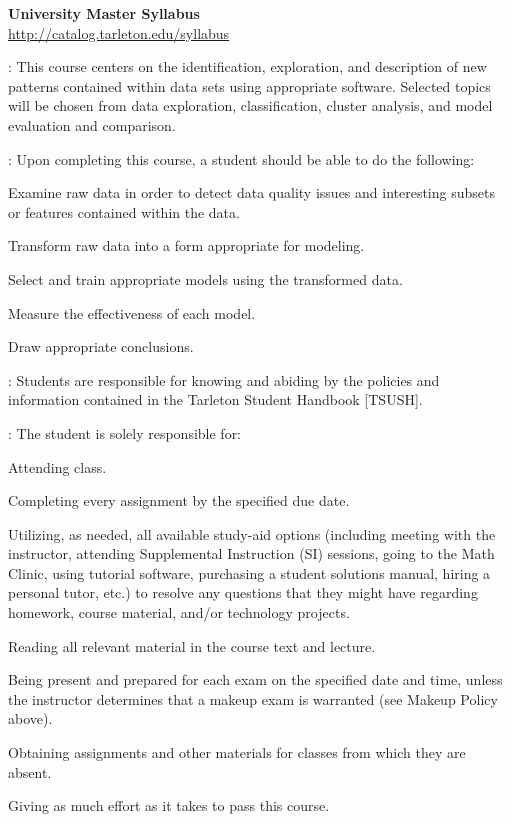 \documentclass[letterpaper]{article}
\begin{document}
\hhrule

\begin{center}
\textbf{\LARGE{University Master Syllabus}}\\
\href{http://catalog.tarleton.edu/syllabus}{\underline{http://catalog.tarleton.edu/syllabus}}
\end{center}

\small
{}: This course centers on the identification, exploration, and description of new patterns contained within data sets using appropriate software. Selected topics will be chosen from data exploration, classification, cluster analysis, and model evaluation and comparison.

: Upon completing this course, a student should be able to do the following: 
\ben[a)]
\item Examine raw data in order to detect data quality issues and interesting subsets or features contained within the data.
\item Transform raw data into a form appropriate for modeling.
\item Select and train appropriate models using the transformed data.
\item Measure the effectiveness of each model.
\item Draw appropriate conclusions.
\een



: Students are responsible for knowing and abiding by the policies and information contained in the Tarleton Student Handbook [TSUSH].

:  The student is solely responsible for:
\bit
	\item	Attending class.
	\item Completing every assignment by the specified due date.
	\item Utilizing, as needed, all available study-aid options (including meeting with the instructor, attending Supplemental Instruction (SI) sessions, going to the Math Clinic, using tutorial software, purchasing a student solutions manual, hiring a personal tutor, etc.) to resolve any questions that they might have regarding homework, course material, and/or technology projects.
	\item	Reading all relevant material in the course text and lecture.
	\item	Being present and prepared for each exam on the specified date and time, unless the instructor determines that a makeup exam is warranted (see Makeup Policy above).
  \item Obtaining assignments and other materials for classes from which they are absent.
  \item Giving as much effort as it takes to pass this course.
\eit
\end{document}
